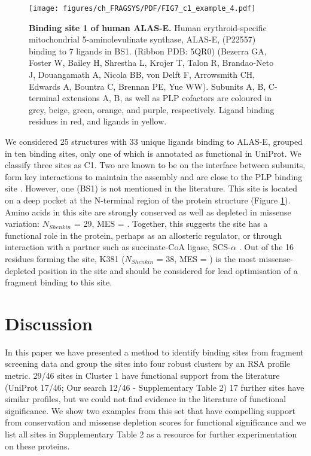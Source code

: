 \begin{figure}[H]
    \centering
    \texttt{[image: figures/ch\_FRAGSYS/PDF/FIG7\_c1\_example\_4.pdf]}
    \caption[Binding site 1 of human ALAS-E]{\textbf{Binding site 1 of human ALAS-E.} Human erythroid-specific mitochondrial 5-aminolevulinate synthase, ALAS-E, (P22557) binding to 7 ligands in BS1. (Ribbon PDB: 5QR0) (Bezerra GA, Foster W, Bailey H, Shrestha L, Krojer T, Talon R, Brandao-Neto J, Douangamath A, Nicola BB, von Delft F, Arrowsmith CH, Edwards A, Bountra C, Brennan PE, Yue WW). Subunits A, B, C-terminal extensions A, B, as well as PLP cofactors are coloured in grey, beige, green, orange, and purple, respectively. Ligand binding residues in red, and ligands in yellow.}
    \label{fig:c1_example_4}
\end{figure}

We considered 25 structures with 33 unique ligands binding to ALAS-E, grouped in ten binding sites, only one of which is annotated as functional in UniProt. We classify three sites as C1. Two are known to be on the interface between subunits, form key interactions to maintain the assembly and are close to the PLP binding site \cite{BAILEY_2020_AMINOLEVULINATE}. However, one (BS1) is not mentioned in the literature. This site is located on a deep pocket at the N-terminal region of the protein structure (Figure \ref{fig:c1_example_4}). Amino acids in this site are strongly conserved as well as depleted in missense variation: $N_{Shenkin}$ = 29, MES = . Together, this suggests the site has a functional role in the protein, perhaps as an allosteric regulator, or through interaction with a partner such as succinate-CoA ligase, SCS-$\alpha$ \cite{FURUYAMA_2000_SIDEROBLASTIC}. Out of the 16 residues forming the site, K381 ($N_{Shenkin}$ = 38, MES = ) is the most missense-depleted position in the site and should be considered for lead optimisation of a fragment binding to this site.

\section{Discussion}

In this paper we have presented a method to identify binding sites from fragment screening data and group the sites into four robust clusters by an RSA profile metric. 29/46 sites in Cluster 1 have functional support from the literature (UniProt 17/46; Our search 12/46 - Supplementary Table 2) 17 further sites have similar profiles, but we could not find evidence in the literature of functional significance. We show two examples from this set that have compelling support from conservation and missense depletion scores for functional significance and we list all sites in Supplementary Table 2 as a resource for further experimentation on these proteins.

